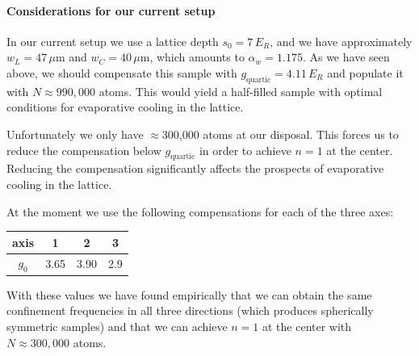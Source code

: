 \documentclass[11pt,letter]{article}
\newcommand{\awaist}{\ensuremath{ \alpha_{w} }}
\begin{document}
\paragraph{Considerations for our current setup}

In our current setup we use a lattice depth $s_{0}=7\,E_{R}$, and we have
approximately $w_{L}=47\,\mu$m and $w_{C}=40\,\mu$m,  which amounts to
$\awaist=1.175$.   As we have seen above, we should compensate this sample with
$g_{\text{quartic}} = 4.11\,E_{R}$ and populate it with $N\approx 990,000$
atoms.  This would yield a half-filled sample with optimal conditions for
evaporative cooling in the lattice.   

Unfortunately we only have $\approx$300,000 atoms at our disposal.   This
forces us to reduce the compensation below $g_{\text{quartic}}$  in order to
achieve $n=1$ at the center.   Reducing  the compensation significantly affects
the prospects of evaporative cooling in the lattice.   
 
At the moment we use the following compensations for each of the three axes:
\begin{center}
\begin{tabular}{ c|c|c|c}
   axis & 1 & 2 & 3 \\
   \hline
   $g_{0}$ & 3.65 &  3.90 & 2.9 \\ 
\end{tabular}
\end{center}
With these values we have found empirically that we can obtain the same
confinement frequencies in all three directions (which produces spherically
symmetric samples) and that we can achieve $n=1$ at the center with
$N\approx300,000$ atoms.  
\end{document}

